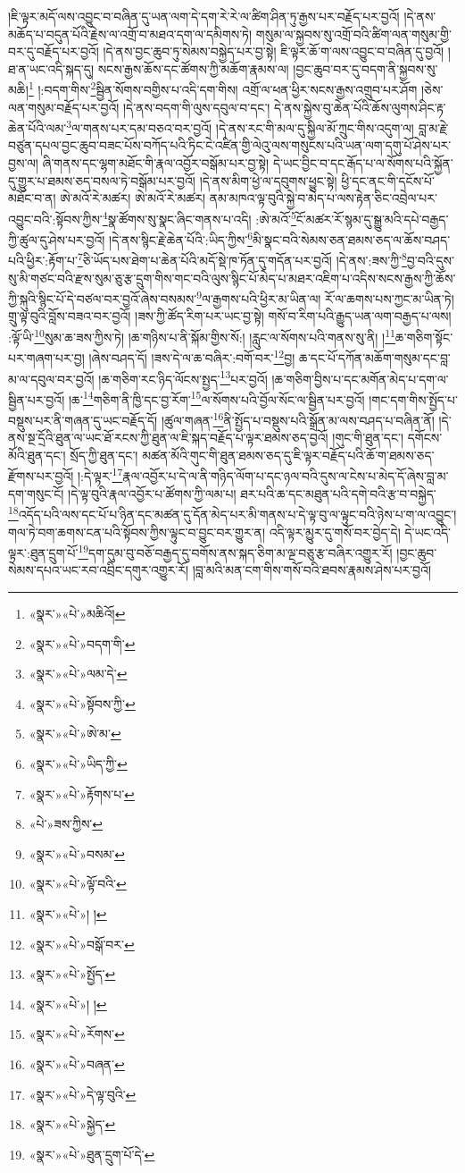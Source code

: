།ཇི་ལྟར་མདོ་ལས་འབྱུང་བ་བཞིན་དུ་ཡན་ལག་དེ་དག་རེ་རེ་ལ་ཚིག་ཤིན་ཏུ་རྒྱས་པར་བརྗོད་པར་བྱའོ། །དེ་ནས་མཆོད་པ་བདུན་པོའི་རྗེས་ལ་འགྲོ་བ་མཐའ་དག་ལ་དམིགས་ཏེ། གསུམ་ལ་སྐྱབས་སུ་འགྲོ་བའི་ཚིག་ལན་གསུམ་གྱི་བར་དུ་བརྗོད་པར་བྱའོ། །དེ་ནས་བྱང་ཆུབ་ཏུ་སེམས་བསྐྱེད་པར་བྱ་སྟེ། ཇི་ལྟར་ཆོ་ག་ལས་འབྱུང་བ་བཞིན་དུ་བྱའོ། །ཐ་ན་ཡང་འདི་སྐད་དུ། སངས་རྒྱས་ཆོས་དང་ཚོགས་ཀྱི་མཆོག་རྣམས་ལ། །བྱང་ཆུབ་བར་དུ་བདག་ནི་སྐྱབས་སུ་མཆི།\footnote{«སྣར་»«པེ་»མཆིའོ།} །:བདག་གིས་\footnote{«སྣར་»«པེ་»བདག་གི་}སྦྱིན་སོགས་བགྱིས་པ་འདི་དག་གིས། འགྲོ་ལ་ཕན་ཕྱིར་སངས་རྒྱས་འགྲུབ་པར་ཤོག །ཅེས་ལན་གསུམ་བརྗོད་པར་བྱའོ། །དེ་ནས་བདག་གི་ལུས་དབུལ་བ་དང་། དེ་ནས་སྐྱེས་བུ་ཆེན་པོའི་ཆོས་ལུགས་ཤིང་རྟ་ཆེན་པོའི་ལམ་\footnote{«སྣར་»«པེ་»ལམ་དེ་}ལ་གནས་པར་དམ་བཅའ་བར་བྱའོ། །དེ་ནས་རང་གི་མལ་དུ་སྐྱིལ་མོ་ཀྲུང་གིས་འདུག་ལ། བླ་མ་རྗེ་བཙུན་དཔལ་བྱང་ཆུབ་བཟང་པོས་བཀོད་པའི་ཏིང་ངེ་འཛིན་གྱི་ལེའུ་ལས་གསུངས་པའི་ཡན་ལག་དགུ་པོ་ཤེས་པར་བྱས་ལ། ཞི་གནས་དང་ལྷག་མཐོང་གི་རྣལ་འབྱོར་བསྒོམ་པར་བྱ་སྟེ། དེ་ཡང་བྱིང་བ་དང་རྒོད་པ་ལ་སོགས་པའི་སྐྱོན་དུ་གྱུར་པ་ཐམས་ཅད་བསལ་ཏེ་བསྒོམ་པར་བྱའོ། །དེ་ནས་མིག་ཕྱེ་ལ་དབུགས་ཕྱུང་སྟེ། ཕྱི་དང་ནང་གི་དངོས་པོ་མཐོང་བ་ན། ཨེ་མའོ་རེ་མཚར། ཨེ་མའོ་རེ་མཚར། ནམ་མཁའ་ལྟ་བུའི་སྐྱེ་བ་མེད་པ་ལས་རྟེན་ཅིང་འབྲེལ་པར་འབྱུང་བའི་:སྟོབས་ཀྱིས་\footnote{«སྣར་»«པེ་»སྟོབས་ཀྱི་}སྣ་ཚོགས་སུ་སྣང་ཞིང་གནས་པ་འདི། :ཨེ་མའོ་\footnote{«སྣར་»«པེ་»ཨེ་མ་}ངོ་མཚར་རོ་སྙམ་དུ་སྒྱུ་མའི་དཔེ་བརྒྱད་ཀྱི་ཚུལ་དུ་ཤེས་པར་བྱའོ། །དེ་ནས་སྙིང་རྗེ་ཆེན་པོའི་:ཡིད་ཀྱིས་\footnote{«སྣར་»«པེ་»ཡིད་ཀྱི་}མི་སྣང་བའི་སེམས་ཅན་ཐམས་ཅད་ལ་ཆོས་བཤད་པའི་ཕྱིར་:རྟོག་པ་\footnote{«སྣར་»«པེ་»རྟོགས་པ་}ཅི་ཡོད་པས་ཐེག་པ་ཆེན་པོའི་མདོ་སྡེ་ཁ་ཏོན་དུ་གདོན་པར་བྱའོ། །དེ་ནས་:ཟས་ཀྱི་\footnote{«པེ་»ཟས་ཀྱིས་}བྱ་བའི་དུས་སུ་མི་གཙང་བའི་རྫས་སུམ་ཅུ་རྩ་དྲུག་གིས་གང་བའི་ལུས་སྙིང་པོ་མེད་པ་མཐར་འཇིག་པ་འདིས་སངས་རྒྱས་ཀྱི་ཆོས་ཀྱི་སྐུའི་སྙིང་པོ་དེ་བཙལ་བར་བྱའོ་ཞེས་བསམས་\footnote{«སྣར་»«པེ་»བསམ་}ལ་རྒྱགས་པའི་ཕྱིར་མ་ཡིན་ལ། རོ་ལ་ཆགས་པས་ཀྱང་མ་ཡིན་ཏེ། གྲུ་ལྟ་བུའི་བློས་བཟའ་བར་བྱའོ། །ཟས་ཀྱི་ཚོད་རིག་པར་ཡང་བྱ་སྟེ། གསོ་བ་རིག་པའི་རྒྱུད་ཡན་ལག་བརྒྱད་པ་ལས། :ལྟོ་ཡི་\footnote{«སྣར་»«པེ་»ལྟོ་བའི་}སུམ་ཆ་ཟས་ཀྱིས་ཏེ། །ཆ་གཉིས་པ་ནི་སྐོམ་གྱིས་སོ:། །རླུང་ལ་སོགས་པའི་གནས་སུ་ནི། །\footnote{«སྣར་»«པེ་»། །}ཆ་གཅིག་སྟོང་པར་གཞག་པར་བྱ། །ཞེས་བཤད་དོ། །ཟས་དེ་ལ་ཆ་བཞིར་:བགོ་བར་\footnote{«སྣར་»«པེ་»བསྒོ་བར་}བྱ། ཆ་དང་པོ་དཀོན་མཆོག་གསུམ་དང་བླ་མ་ལ་དབུལ་བར་བྱའོ། །ཆ་གཅིག་རང་ཉིད་ལོངས་སྤྱད་\footnote{«སྣར་»«པེ་»སྤྱོད་}པར་བྱའོ། །ཆ་གཅིག་བྱིས་པ་དང་མགོན་མེད་པ་དག་ལ་སྦྱིན་པར་བྱའོ། །ཆ་\footnote{«སྣར་»«པེ་»། །}གཅིག་ནི་ཁྱི་དང་བྱ་རོག་\footnote{«སྣར་»«པེ་»རོགས་}ལ་སོགས་པའི་བྱོལ་སོང་ལ་སྦྱིན་པར་བྱའོ། །གང་དག་གིས་སྤྱོད་པ་བསྡུས་པར་ནི་གཞན་དུ་ཡང་བརྗོད་དོ། །ཚུལ་གཞན་\footnote{«སྣར་»«པེ་»བཞན་}ནི་སྤྱོད་པ་བསྡུས་པའི་སྒྲོན་མ་ལས་བཤད་པ་བཞིན་ནོ། །དེ་ནས་སྔ་དྲོའི་ཐུན་ལ་ཡང་ཐོ་རངས་ཀྱི་ཐུན་ལ་ཇི་སྐད་བརྗོད་པ་ལྟར་ཐམས་ཅད་བྱའོ། །གུང་གི་ཐུན་དང་། དགོངས་མོའི་ཐུན་དང་། སྲོད་ཀྱི་ཐུན་དང་། མཚན་མོའི་གུང་གི་ཐུན་ཐམས་ཅད་དུ་ཇི་ལྟར་བརྗོད་པའི་ཆོ་ག་ཐམས་ཅད་རྫོགས་པར་བྱའོ། །:དེ་ལྟར་\footnote{«སྣར་»«པེ་»དེ་ལྟ་བུའི་}རྣལ་འབྱོར་པ་དེ་ལ་ནི་གཉིད་ལོག་པ་དང་ཉལ་བའི་དུས་ལ་ངེས་པ་མེད་དོ་ཞེས་བླ་མ་དག་གསུང་ངོ། །དེ་ལྟ་བུའི་རྣལ་འབྱོར་པ་ཚོགས་ཀྱི་ལམ་པ། ཐར་པའི་ཆ་དང་མཐུན་པའི་དགེ་བའི་རྩ་བ་བསྐྱེད་\footnote{«སྣར་»«པེ་»སྐྱེད་}འདོད་པའི་ལས་དང་པོ་པ་ཉིན་དང་མཚན་དུ་དོན་མེད་པར་མི་གནས་པ་དེ་ལྟ་བུ་ལ་ལྟུང་བའི་ཉེས་པ་ག་ལ་འབྱུང་། གལ་ཏེ་བག་ཆགས་ངན་པའི་སྟོབས་ཀྱིས་ལྟུང་བ་བྱུང་བར་གྱུར་ན། འདི་ལྟར་མྱུར་དུ་གསོ་བར་བྱེད་དེ། དེ་ཡང་འདི་ལྟར་:ཐུན་དྲུག་པོ་\footnote{«སྣར་»«པེ་»ཐུན་དྲུག་པོ་དེ་}དག་དུམ་བུ་བཅོ་བརྒྱད་དུ་བགོས་ནས་སྐད་ཅིག་མ་ལྔ་བཅུ་རྩ་བཞིར་འགྱུར་རོ། །བྱང་ཆུབ་སེམས་དཔའ་ཡང་རབ་འབྲིང་དགུར་འགྱུར་རོ། །བླ་མའི་མན་ངག་གིས་གསོ་བའི་ཐབས་རྣམས་ཤེས་པར་བྱའོ། 